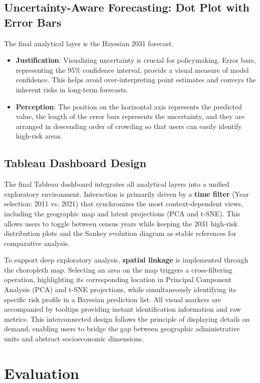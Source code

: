 \documentclass[conference]{IEEEtran}
\begin{document}
\subsection{Uncertainty-Aware Forecasting: Dot Plot with Error Bars}
The final analytical layer is the Bayesian 2031 forecast.
\begin{itemize}
    \item \textbf{Justification}: Visualizing uncertainty is crucial for policymaking. Error bars, representing the 95\% confidence interval, provide a visual measure of model confidence. This helps avoid over-interpreting point estimates and conveys the inherent risks in long-term forecasts.
    \item \textbf{Perception}: The position on the horizontal axis represents the predicted value, the length of the error bars represents the uncertainty, and they are arranged in descending order of crowding so that users can easily identify high-risk areas.
\end{itemize}

\subsection{Tableau Dashboard Design}
The final Tableau dashboard integrates all analytical layers into a unified exploratory environment. Interaction is primarily driven by a \textbf{time filter} (Year selection: 2011 vs. 2021) that synchronizes the most context-dependent views, including the geographic map and latent projections (PCA and t-SNE). This allows users to toggle between census years while keeping the 2031 high-risk distribution plots and the Sankey evolution diagram as stable references for comparative analysis. 

To support deep exploratory analysis, \textbf{spatial linkage} is implemented through the choropleth map. Selecting an area on the map triggers a cross-filtering operation, highlighting its corresponding location in Principal Component Analysis (PCA) and t-SNE projections, while simultaneously identifying its specific risk profile in a Bayesian prediction list. All visual markers are accompanied by tooltips providing instant identification information and raw metrics. This interconnected design follows the principle of displaying details on demand, enabling users to bridge the gap between geographic administrative units and abstract socioeconomic dimensions.


\section{Evaluation}
\end{document}
